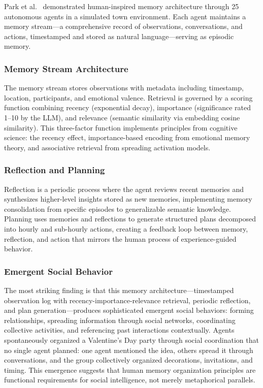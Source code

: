 \documentclass[11pt,letterpaper]{article}
\begin{document}
Park et al.\ \cite{park2023generative} demonstrated human-inspired memory architecture through 25 autonomous agents in a simulated town environment. Each agent maintains a memory stream---a comprehensive record of observations, conversations, and actions, timestamped and stored as natural language---serving as episodic memory.

\subsubsection{Memory Stream Architecture}

The memory stream stores observations with metadata including timestamp, location, participants, and emotional valence. Retrieval is governed by a scoring function combining recency (exponential decay), importance (significance rated 1--10 by the LLM), and relevance (semantic similarity via embedding cosine similarity). This three-factor function implements principles from cognitive science: the recency effect, importance-based encoding from emotional memory theory, and associative retrieval from spreading activation models.

\subsubsection{Reflection and Planning}

Reflection is a periodic process where the agent reviews recent memories and synthesizes higher-level insights stored as new memories, implementing memory consolidation from specific episodes to generalizable semantic knowledge. Planning uses memories and reflections to generate structured plans decomposed into hourly and sub-hourly actions, creating a feedback loop between memory, reflection, and action that mirrors the human process of experience-guided behavior.

\subsubsection{Emergent Social Behavior}

The most striking finding is that this memory architecture---timestamped observation log with recency-importance-relevance retrieval, periodic reflection, and plan generation---produces sophisticated emergent social behaviors: forming relationships, spreading information through social networks, coordinating collective activities, and referencing past interactions contextually. Agents spontaneously organized a Valentine's Day party through social coordination that no single agent planned: one agent mentioned the idea, others spread it through conversations, and the group collectively organized decorations, invitations, and timing. This emergence suggests that human memory organization principles are functional requirements for social intelligence, not merely metaphorical parallels.
\end{document}
